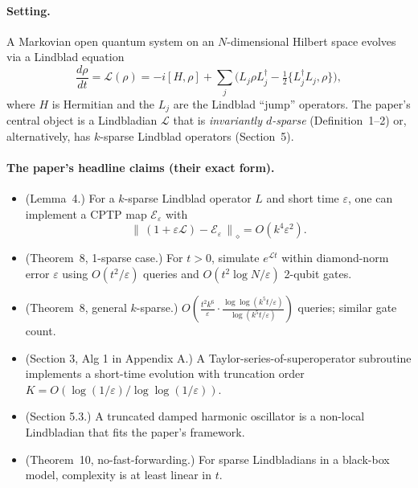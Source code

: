 \documentclass[11pt]{article}
\newcommand{\diamondnorm}[1]{\left\lVert #1 \right\rVert_{\diamond}}
\begin{document}
\paragraph{Setting.}
A Markovian open quantum system on an $N$-dimensional Hilbert space evolves via a Lindblad equation
\begin{equation}
  \frac{d\rho}{dt} = \mathcal{L}(\rho)
  = -i[H, \rho] + \sum_j \Big( L_j \rho L_j^\dagger - \tfrac{1}{2}\{L_j^\dagger L_j, \rho\} \Big),
  \label{eq:lindblad}
\end{equation}
where $H$ is Hermitian and the $L_j$ are the Lindblad ``jump'' operators.  The paper's central object is a Lindbladian $\mathcal{L}$ that is \emph{invariantly $d$-sparse} (Definition~1--2) or, alternatively, has $k$-sparse Lindblad operators (Section~5).

\paragraph{The paper's headline claims (their exact form).}
\begin{itemize}
  \item[\textbf{C1}] (Lemma~4.) For a $k$-sparse Lindblad operator $L$ and short time $\varepsilon$, one can implement a CPTP map $\mathcal{E}_\varepsilon$ with
  \begin{equation}
    \diamondnorm{\,(1 + \varepsilon \mathcal{L}) - \mathcal{E}_\varepsilon\,} = O(k^4 \varepsilon^2).
    \label{eq:lem4}
  \end{equation}
  \item[\textbf{C2}] (Theorem~8, 1-sparse case.) For $t > 0$, simulate $e^{\mathcal{L}t}$ within diamond-norm error $\varepsilon$ using $O(t^2/\varepsilon)$ queries and $O(t^2 \log N / \varepsilon)$ 2-qubit gates.
  \item[\textbf{C3}] (Theorem~8, general $k$-sparse.) $O\!\left(\frac{t^2 k^6}{\varepsilon} \cdot \frac{\log\log(k^5 t/\varepsilon)}{\log(k^5 t/\varepsilon)}\right)$ queries; similar gate count.
  \item[\textbf{C4}] (Section 3, Alg 1 in Appendix A.) A Taylor-series-of-superoperator subroutine implements a short-time evolution with truncation order $K = O(\log(1/\varepsilon)/\log\log(1/\varepsilon))$.
  \item[\textbf{C5}] (Section 5.3.) A truncated damped harmonic oscillator is a non-local Lindbladian that fits the paper's framework.
  \item[\textbf{C6}] (Theorem~10, no-fast-forwarding.) For sparse Lindbladians in a black-box model, complexity is at least linear in $t$.
\end{itemize}
\end{document}

